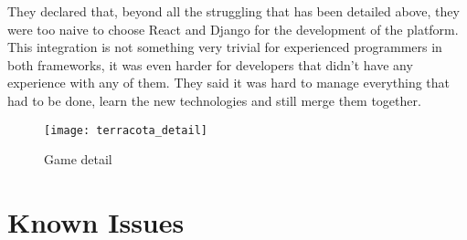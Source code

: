 They declared that, beyond all the struggling that has been detailed above, they were too naive to choose React and Django for the development of the platform. This integration is not something very trivial for experienced programmers in both frameworks, it was even harder for developers that didn't have any experience with any of them. They said it was hard to manage everything that had to be done, learn the new technologies and still merge them together.


\begin{figure}[h!]
\centering
\texttt{[image: terracota\_detail]}
\caption{Game detail}
\label {fig:game_detail}
\end{figure}

\section{Known Issues}
\label {sec:issues}

